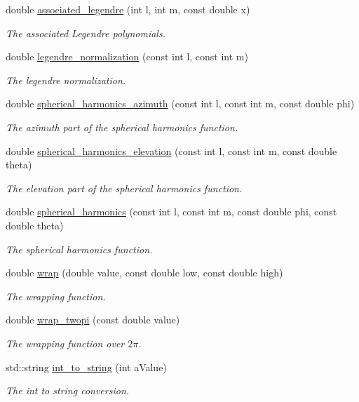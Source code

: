 \begin{DoxyCompactItemize}
double \hyperlink{namespace_hoa_adb762b8ea445347c41725a66bff424ec}{associated\-\_\-legendre} (int l, int m, const double x)
\begin{DoxyCompactList}\small\item\em The associated Legendre polynomials. \end{DoxyCompactList}\item 
double \hyperlink{namespace_hoa_af22a7c314138f53fd15901567045c65d}{legendre\-\_\-normalization} (const int l, const int m)
\begin{DoxyCompactList}\small\item\em The legendre normalization. \end{DoxyCompactList}\item 
double \hyperlink{namespace_hoa_a746287cf728e5445e744ab01784175e6}{spherical\-\_\-harmonics\-\_\-azimuth} (const int l, const int m, const double phi)
\begin{DoxyCompactList}\small\item\em The azimuth part of the spherical harmonics function. \end{DoxyCompactList}\item 
double \hyperlink{namespace_hoa_a6515939c558d1e535c4561aee6febde6}{spherical\-\_\-harmonics\-\_\-elevation} (const int l, const int m, const double theta)
\begin{DoxyCompactList}\small\item\em The elevation part of the spherical harmonics function. \end{DoxyCompactList}\item 
double \hyperlink{namespace_hoa_aee959ace8e8c9f2c5a2bb01bfe33719d}{spherical\-\_\-harmonics} (const int l, const int m, const double phi, const double theta)
\begin{DoxyCompactList}\small\item\em The spherical harmonics function. \end{DoxyCompactList}\item 
double \hyperlink{namespace_hoa_a313552058c836fb832ead703eb1c8ca1}{wrap} (double value, const double low, const double high)
\begin{DoxyCompactList}\small\item\em The wrapping function. \end{DoxyCompactList}\item 
double \hyperlink{namespace_hoa_a951a6800c87c7cb7428ccb05ed778e84}{wrap\-\_\-twopi} (const double value)
\begin{DoxyCompactList}\small\item\em The wrapping function over $2\pi$. \end{DoxyCompactList}\item 
std\-::string \hyperlink{namespace_hoa_a383e28307f0bbd7c0e4af194ebabe66f}{int\-\_\-to\-\_\-string} (int a\-Value)
\begin{DoxyCompactList}\small\item\em The int to string conversion. \end{DoxyCompactList}\end{DoxyCompactItemize}


